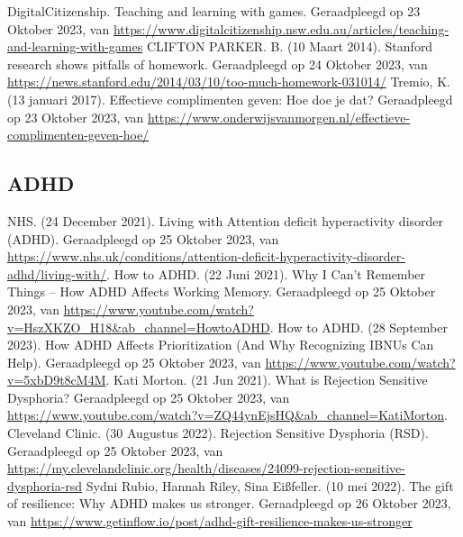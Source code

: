 \documentclass{article}
\begin{document}
\begin{thebibliography}{9}
                DigitalCitizenship. Teaching and learning with games. Geraadpleegd op 23 Oktober 2023, van \url{https://www.digitalcitizenship.nsw.edu.au/articles/teaching-and-learning-with-games}
                CLIFTON PARKER. B. (10 Maart 2014). Stanford research shows pitfalls of homework. Geraadpleegd op 24 Oktober 2023, van \url{https://news.stanford.edu/2014/03/10/too-much-homework-031014/}
                Tremio, K. (13 januari 2017). Effectieve complimenten geven: Hoe doe je dat? Geraadpleegd op 23 Oktober 2023, van \url{https://www.onderwijsvanmorgen.nl/effectieve-complimenten-geven-hoe/}

        \item\subsection*{ADHD}
                NHS. (24 December 2021). Living with Attention deficit hyperactivity disorder (ADHD). Geraadpleegd op 25 Oktober 2023, van \url{https://www.nhs.uk/conditions/attention-deficit-hyperactivity-disorder-adhd/living-with/}.
                How to ADHD. (22 Juni 2021). Why I Can't Remember Things -- How ADHD Affects Working Memory. Geraadpleegd op 25 Oktober 2023, van \url{https://www.youtube.com/watch?v=HszXKZO_H18&ab_channel=HowtoADHD}.
                How to ADHD. (28 September 2023). How ADHD Affects Prioritization (And Why Recognizing IBNUs Can Help). Geraadpleegd op 25 Oktober 2023, van \url{https://www.youtube.com/watch?v=5xbD9t8cM4M}.
                Kati Morton. (21 Jun 2021). What is Rejection Sensitive Dysphoria? Geraadpleegd op 25 Oktober 2023, van \url{https://www.youtube.com/watch?v=ZQ44ynEjsHQ&ab_channel=KatiMorton}.
                Cleveland Clinic. (30 Augustus 2022). Rejection Sensitive Dysphoria (RSD). Geraadpleegd op 25 Oktober 2023, van \url{https://my.clevelandclinic.org/health/diseases/24099-rejection-sensitive-dysphoria-rsd}
                Sydni Rubio, Hannah Riley, Sina Eißfeller. (10 mei 2022). The gift of resilience: Why ADHD makes us stronger. Geraadpleegd op 26 Oktober 2023, van \url{https://www.getinflow.io/post/adhd-gift-resilience-makes-us-stronger}

\end{thebibliography}
\end{document}

